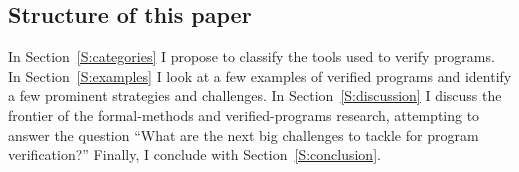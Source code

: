 \subsection{Structure of this paper}

In Section~\ref{S:categories} I propose to classify the tools used to verify
programs. In Section~\ref{S:examples} I look at a few examples of verified
programs and identify a few prominent strategies and challenges. In
Section~\ref{S:discussion} I discuss the frontier of the formal-methods and
verified-programs research, attempting to answer the question ``What are the
next big challenges to tackle for program verification?'' Finally, I conclude
with Section~\ref{S:conclusion}.
